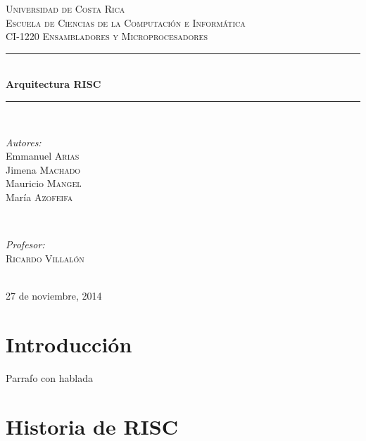 \documentclass[10pt,a4paper]{article}
\begin{document}
\begin{titlepage}

\newcommand{\HRule}{\rule{\linewidth}{0.5mm}} 

\center

\textsc{\LARGE Universidad de Costa Rica}\\[1.5cm]
\textsc{\Large Escuela de Ciencias de la Computación e Informática}\\[0.5cm] 
\textsc{\large CI-1220 Ensambladores y Microprocesadores}\\[0.5cm] 

\HRule \\[0.4cm]
{ \huge \bfseries Arquitectura RISC}\\[0.4cm] %
\HRule \\[1.5cm]

\begin{minipage}{0.4\textwidth}
\begin{flushleft} \large
\emph{Autores:}\\
Emmanuel \textsc{Arias}\\ 
Jimena \textsc{Machado} \\
Mauricio \textsc{Mangel}\\
María \textsc{Azofeifa}\\
\end{flushleft}
\end{minipage}
~
\begin{minipage}{0.4\textwidth}
\begin{flushright} \large
\emph{Profesor:} \\
 \textsc{Ricardo Villalón} 
\end{flushright}
\end{minipage}\\[4cm]

{\large 27 de noviembre, 2014}\\[3cm] 

\vfill 

\end{titlepage}
\section*{Introducción}
\paragraph{}
Parrafo con hablada

\section*{Historia de RISC}
\end{document}
